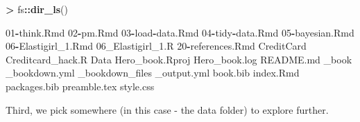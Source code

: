 \documentclass[]{book}
\newenvironment{Shaded}{\begin{snugshade}}{\end{snugshade}}
\newcommand{\DecValTok}[1]{\textcolor[rgb]{0.00,0.00,0.81}{#1}}
\newcommand{\FloatTok}[1]{\textcolor[rgb]{0.00,0.00,0.81}{#1}}
\newcommand{\KeywordTok}[1]{\textcolor[rgb]{0.13,0.29,0.53}{\textbf{#1}}}
\newcommand{\NormalTok}[1]{#1}
\newcommand{\OperatorTok}[1]{\textcolor[rgb]{0.81,0.36,0.00}{\textbf{#1}}}
\newcommand{\StringTok}[1]{\textcolor[rgb]{0.31,0.60,0.02}{#1}}
\begin{document}
\begin{Shaded}
\begin{Highlighting}[]
\OperatorTok{>}\StringTok{ }\NormalTok{fs}\OperatorTok{::}\KeywordTok{dir_ls}\NormalTok{()}

\DecValTok{01}\OperatorTok{-}\NormalTok{think.Rmd           }\DecValTok{02}\OperatorTok{-}\NormalTok{pm.Rmd              }\DecValTok{03}\OperatorTok{-}\NormalTok{load}\OperatorTok{-}\NormalTok{data.Rmd       }\DecValTok{04}\OperatorTok{-}\NormalTok{tidy}\OperatorTok{-}\NormalTok{data.Rmd       }
\DecValTok{05}\OperatorTok{-}\NormalTok{bayesian.Rmd        }\DecValTok{06}\OperatorTok{-}\NormalTok{Elastigirl_}\FloatTok{1.}\NormalTok{Rmd }\DecValTok{06}\NormalTok{_Elastigirl_}\FloatTok{1.}\NormalTok{R   }\DecValTok{20}\OperatorTok{-}\NormalTok{references.Rmd      }
\NormalTok{CreditCard             Creditcard_hack.R      Data                   Hero_book.Rproj        }
\NormalTok{Hero_book.log          README.md              _book                  _bookdown.yml          }
\NormalTok{_bookdown_files        _output.yml            book.bib               index.Rmd              }
\NormalTok{packages.bib           preamble.tex           style.css }
\end{Highlighting}
\end{Shaded}

Third, we pick somewhere (in this case - the data folder) to explore further.
\end{document}
